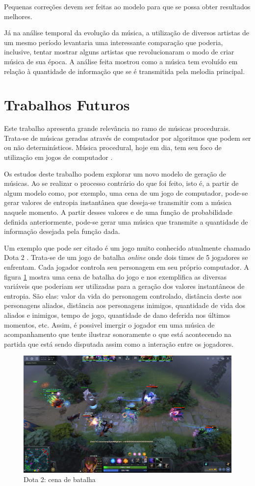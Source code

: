Pequenas correções devem ser feitas ao modelo para que se possa obter resultados melhores.

Já na análise temporal da evolução da música, a utilização de diversos artistas de um mesmo período levantaria uma interessante comparação que poderia, inclusive, tentar mostrar alguns artistas que revolucionaram o modo de criar música de sua época. A análise feita mostrou como a música tem evoluído em relação à quantidade de informação que se é transmitida pela melodia principal.

\section{Trabalhos Futuros}

Este trabalho apresenta grande relevância no ramo de músicas procedurais. Trata-se de músicas geradas através de computador por algoritmos que podem ser ou não determinísticos. Música procedural, hoje em dia, tem seu foco de utilização em jogos de computador \cite{procedural}.

Os estudos deste trabalho podem explorar um novo modelo de geração de músicas. Ao se realizar o processo contrário do que foi feito, isto é, a partir de algum modelo como, por exemplo, uma cena de um jogo de computador, pode-se gerar valores de entropia instantânea que deseja-se transmitir com a música naquele momento. A partir desses valores e de uma função de probabilidade definida anteriormente, pode-se gerar uma música que transmite a quantidade de informação desejada pela função dada.

Um exemplo que pode ser citado é um jogo muito conhecido atualmente chamado Dota 2 \cite{dota}. Trata-se de um jogo de batalha \textit{online} onde dois times de 5 jogadores se enfrentam. Cada jogador controla seu personagem em seu próprio computador. A figura \ref{fig:dota} mostra uma cena de batalha do jogo e nos exemplifica as diversas variáveis que poderiam ser utilizadas para a geração dos valores instantâneos de entropia. São elas: valor da vida do personagem controlado, distância deste aos personagens aliados, distância aos personagens inimigos, quantidade de vida dos aliados e inimigos, tempo de jogo, quantidade de dano deferida nos últimos momentos, etc. Assim, é possivel imergir o jogador em uma música de acompanhamento que tente ilustrar sonoramente o que está acontecendo na partida que está sendo disputada assim como a interação entre os jogadores.


\begin{figure}[H]
    \centering
    \includegraphics[width=\textwidth]{Cap4/dota.jpg}
    \caption{Dota 2: cena de batalha}
    \label{fig:dota}
\end{figure}